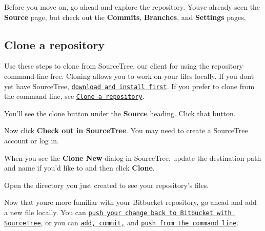 Before you move on, go ahead and explore the repository. You\textquotesingle{}ve already seen the {\bfseries Source} page, but check out the {\bfseries Commits}, {\bfseries Branches}, and {\bfseries Settings} pages. 



\subsection*{Clone a repository}

Use these steps to clone from Source\+Tree, our client for using the repository command-\/line free. Cloning allows you to work on your files locally. If you don\textquotesingle{}t yet have Source\+Tree, \href{https://www.sourcetreeapp.com/}{\tt download and install first}. If you prefer to clone from the command line, see \href{https://confluence.atlassian.com/x/4whODQ}{\tt Clone a repository}.


\begin{DoxyEnumerate}
\item You’ll see the clone button under the {\bfseries Source} heading. Click that button.
\item Now click {\bfseries Check out in Source\+Tree}. You may need to create a Source\+Tree account or log in.
\item When you see the {\bfseries Clone New} dialog in Source\+Tree, update the destination path and name if you’d like to and then click {\bfseries Clone}.
\item Open the directory you just created to see your repository’s files.
\end{DoxyEnumerate}

Now that you\textquotesingle{}re more familiar with your Bitbucket repository, go ahead and add a new file locally. You can \href{https://confluence.atlassian.com/x/iqyBMg}{\tt push your change back to Bitbucket with Source\+Tree}, or you can \href{https://confluence.atlassian.com/x/8QhODQ}{\tt add, commit,} and \href{https://confluence.atlassian.com/x/NQ0zDQ}{\tt push from the command line}. 